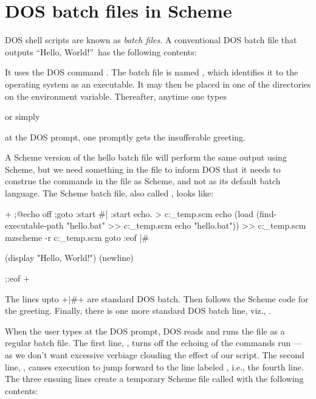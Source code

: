 \chapter{DOS batch files in Scheme}
\label{dos}

DOS shell scripts are known as {\em batch files}.  A
conventional DOS batch file that outputs “Hello,
World!”\ has the following contents:


It uses the DOS command .  The batch file is
named , which identifies it to the
operating system as an executable.  It may then be
placed in one of the directories on the 
environment variable.  Thereafter, anytime one types


or simply


\n at the DOS prompt, one promptly gets the
insufferable greeting.

A Scheme version of the hello batch file will perform
the same output using Scheme, but we need something in
the file to inform DOS that it needs to construe the
commands in the file as Scheme, and not as its default
batch language.  The Scheme batch file, also called
, looks like:

\p+
;@echo off
;goto :start
#|
:start
echo. > c:\_temp.scm
echo (load (find-executable-path "hello.bat" >> c:\_temp.scm
echo "hello.bat")) >> c:\_temp.scm
mzscheme -r c:\_temp.scm %
goto :eof
|#

(display "Hello, World!")
(newline)

;:eof
+

The lines upto \p+|#+ are standard DOS batch.  Then
follows the Scheme code for the greeting.  Finally,
there is one more standard DOS batch line, viz.,
.  

When the user types  at the DOS prompt, DOS
reads and runs the file  as a regular
batch file.  The first line, , turns off
the echoing of the commands run — as we don’t want
excessive verbiage clouding the effect of our script.
The second line, , causes execution to
jump forward to the line labeled , i.e., the
fourth line.  The three ensuing  lines create a
temporary Scheme file called  with the
following contents:


